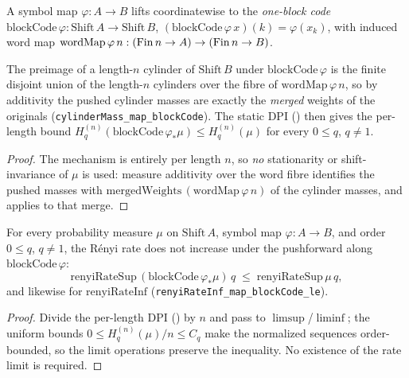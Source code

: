 \begin{definition}\label{blockCode}
  \leanok
  A symbol map \(\varphi : A \to B\) lifts coordinatewise to the \emph{one-block code}
  \(\mathrm{blockCode}\,\varphi : \mathrm{Shift}\,A \to \mathrm{Shift}\,B\),
  \((\mathrm{blockCode}\,\varphi\,x)(k) = \varphi(x_k)\), with induced word map
  \(\mathrm{wordMap}\,\varphi\,n : (\operatorname{Fin} n \to A) \to (\operatorname{Fin} n \to B)\).
\end{definition}

\begin{theorem}\label{renyiEntropySeq_map_blockCode_le}
  \leanok
  The preimage of a length-\(n\) cylinder of \(\mathrm{Shift}\,B\) under \(\mathrm{blockCode}\,\varphi\)
  is the finite disjoint union of the length-\(n\) cylinders over the fibre of
  \(\mathrm{wordMap}\,\varphi\,n\), so by additivity the pushed cylinder masses are exactly the
  \emph{merged} weights of the originals (\texttt{cylinderMass\_map\_blockCode}). The static DPI
  () then gives the per-length bound
  \(H_q^{(n)}(\mathrm{blockCode}\,\varphi_*\mu) \le H_q^{(n)}(\mu)\) for every \(0 \le q\), \(q \ne 1\).
\end{theorem}
\begin{proof}\leanok
  The mechanism is entirely per length \(n\), so \emph{no} stationarity or shift-invariance of
  \(\mu\) is used: measure additivity over the word fibre identifies the pushed masses with
  \(\mathrm{mergedWeights}\,(\mathrm{wordMap}\,\varphi\,n)\) of the cylinder masses, and
   applies to that merge.
\end{proof}

\begin{theorem}\label{renyiRateSup_map_blockCode_le}
  \leanok
  For every probability measure \(\mu\) on \(\mathrm{Shift}\,A\), symbol map \(\varphi : A \to B\),
  and order \(0 \le q\), \(q \ne 1\), the R\'enyi rate does not increase under the pushforward along
  \(\mathrm{blockCode}\,\varphi\):
  \[
    \mathrm{renyiRateSup}\,(\mathrm{blockCode}\,\varphi_*\mu)\,q \;\le\; \mathrm{renyiRateSup}\,\mu\,q,
  \]
  and likewise for \(\mathrm{renyiRateInf}\) (\texttt{renyiRateInf\_map\_blockCode\_le}).
\end{theorem}
\begin{proof}\leanok
  Divide the per-length DPI () by \(n\) and pass to
  \(\limsup\)/\(\liminf\); the uniform bounds \(0 \le H_q^{(n)}(\mu)/n \le C_q\) make the normalized
  sequences order-bounded, so the limit operations preserve the inequality. No existence of the rate
  limit is required.
\end{proof}


